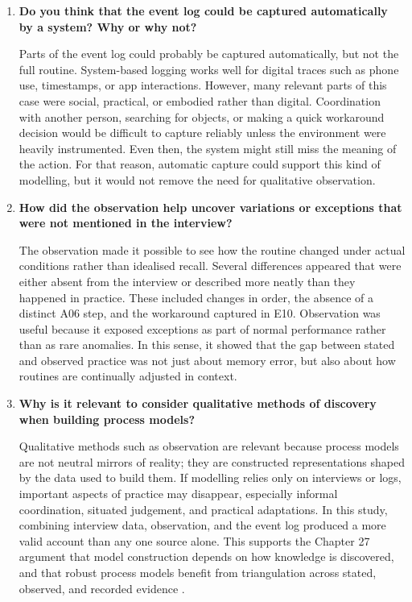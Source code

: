 \begin{enumerate}
\item \textbf{Do you think that the event log could be captured automatically by a system? Why or why not?}

Parts of the event log could probably be captured automatically, but not the full routine. System-based logging works well for digital traces such as phone use, timestamps, or app interactions. However, many relevant parts of this case were social, practical, or embodied rather than digital. Coordination with another person, searching for objects, or making a quick workaround decision would be difficult to capture reliably unless the environment were heavily instrumented. Even then, the system might still miss the meaning of the action. For that reason, automatic capture could support this kind of modelling, but it would not remove the need for qualitative observation.

\item \textbf{How did the observation help uncover variations or exceptions that were not mentioned in the interview?}

The observation made it possible to see how the routine changed under actual conditions rather than idealised recall. Several differences appeared that were either absent from the interview or described more neatly than they happened in practice. These included changes in order, the absence of a distinct A06 step, and the workaround captured in E10. Observation was useful because it exposed exceptions as part of normal performance rather than as rare anomalies. In this sense, it showed that the gap between stated and observed practice was not just about memory error, but also about how routines are continually adjusted in context.

\item \textbf{Why is it relevant to consider qualitative methods of discovery when building process models?}

Qualitative methods such as observation are relevant because process models are not neutral mirrors of reality; they are constructed representations shaped by the data used to build them. If modelling relies only on interviews or logs, important aspects of practice may disappear, especially informal coordination, situated judgement, and practical adaptations. In this study, combining interview data, observation, and the event log produced a more valid account than any one source alone. This supports the Chapter 27 argument that model construction depends on how knowledge is discovered, and that robust process models benefit from triangulation across stated, observed, and recorded evidence .
\end{enumerate}

